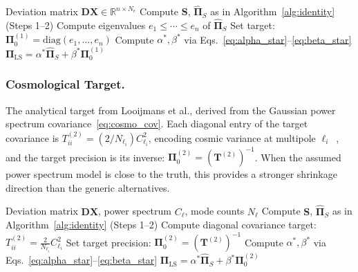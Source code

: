 \begin{algorithm}[t]
\caption{Direct Precision Shrinkage (Eigenvalue Target)}
\label{alg:eigenvalue}
\begin{algorithmic}[1]
\REQUIRE Deviation matrix $\mathbf{DX} \in \mathbb{R}^{n \times N_e}$
\STATE Compute $\mathbf{S}$, $\hat{\boldsymbol{\Pi}}_S$ as in Algorithm~\ref{alg:identity} (Steps 1--2)
\STATE Compute eigenvalues $e_1 \leq \cdots \leq e_n$ of $\hat{\boldsymbol{\Pi}}_S$
\STATE Set target: $\boldsymbol{\Pi}_0^{(1)} = \text{diag}(e_1, \ldots, e_n)$
\STATE Compute $\alpha^*, \beta^*$ via Eqs.~\eqref{eq:alpha_star}--\eqref{eq:beta_star}
\RETURN $\boldsymbol{\Pi}_{\text{LS}} = \alpha^* \hat{\boldsymbol{\Pi}}_S + \beta^* \boldsymbol{\Pi}_0^{(1)}$
\end{algorithmic}
\end{algorithm}

\subsubsection{Cosmological Target.}

The analytical target from Looijmans et al., derived from the Gaussian power spectrum covariance~\eqref{eq:cosmo_cov}. Each diagonal entry of the target covariance is $T^{(2)}_{ii} = (2/N_{\ell_i}) C_{\ell_i}^2$, encoding cosmic variance at multipole $\ell_i$~\cite{hamilton2006measuring}, and the target precision is its inverse: $\boldsymbol{\Pi}_0^{(2)} = (\mathbf{T}^{(2)})^{-1}$. When the assumed power spectrum model is close to the truth, this provides a stronger shrinkage direction than the generic alternatives.

\begin{algorithm}[t]
\caption{Direct Precision Shrinkage (Cosmological Target)}
\label{alg:cosmo}
\begin{algorithmic}[1]
\REQUIRE Deviation matrix $\mathbf{DX}$, power spectrum $C_\ell$, mode counts $N_\ell$
\STATE Compute $\mathbf{S}$, $\hat{\boldsymbol{\Pi}}_S$ as in Algorithm~\ref{alg:identity} (Steps 1--2)
    \STATE Compute diagonal covariance target: $T^{(2)}_{ii} = \frac{2}{N_{\ell_i}} C_{\ell_i}^2$
\ENDFOR
\STATE Set target precision: $\boldsymbol{\Pi}_0^{(2)} = (\mathbf{T}^{(2)})^{-1}$
\STATE Compute $\alpha^*, \beta^*$ via Eqs.~\eqref{eq:alpha_star}--\eqref{eq:beta_star}
\RETURN $\boldsymbol{\Pi}_{\text{LS}} = \alpha^* \hat{\boldsymbol{\Pi}}_S + \beta^* \boldsymbol{\Pi}_0^{(2)}$
\end{algorithmic}
\end{algorithm}

